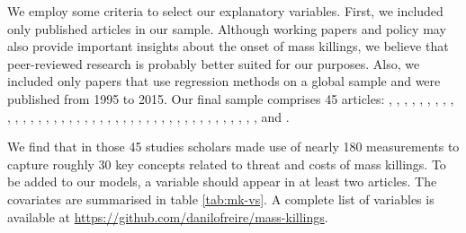 We employ some criteria to select our explanatory variables. First, we included only published articles in our sample. Although working papers and policy may also provide important insights about the onset of mass killings, we believe that peer-reviewed research is probably better suited for our purposes. Also, we included only papers that use regression methods on a global sample and were published from 1995 to 2015. Our final sample comprises 45 articles: \citet{anderton2015new}, \citet{balcells2010rivalry, balcells2011continuation}, \citet{besanccon2005relative}, \citet{bulutgil2015social}, \citet{bundervoet2009livestock}, \citet{clayton2016civilianizing}, \citet{colaresi2008kill}, \citet{downes2006desperate, downes2007restraint},  \citet{easterly2006development}, \citet{eck2007one}, \citet{esteban2015strategic}, \citet{fazal2015particular}, \citet{fjelde2014weakening}, \citet{goldsmith2013forecasting}, \citet{harff2003no}, \citet{joshi2017kills}, \citet{kim2010makes}, \citet{kim2016revolutionary}, \citet{kisangani2007political}, \citet{koren2017means}, \citet{krain1997state}, \citet{manekin2013violence}, \citet{mcdoom2013killed,mcdoom2014predicting}, \citet{melander2009new}, \citet{montalvo2008discrete}, \citet{pilster2016differentiation}, \citet{querido2009state}, \citet{raleigh2012violence}, \citet{rost2013will}, \citet{rummel1995democracy}, \citet{schneider2013accounting}, \citet{siroky2015empire}, \citet{stanton2015regulating}, \citet{sullivan2012blood}, \citet{tir2008domestic}, \citet{ulfelder2008assessing}, \citet{ulfelder2012forecasting}, \citet{uzonyi2015civil, uzonyi2016domestic} \citet{valentino2004draining}, \citet{valentino2006covenants}, \citet{verpoorten2012leave}, \citet{wayman2010explaining}, \citet{wig2016local}, and \citet{yanagizawa2014propaganda}.

We find that in those 45 studies scholars made use of nearly 180 measurements to capture roughly 30 key concepts related to threat and costs of mass killings. To be added to our models, a variable should appear in at least two articles. The covariates are summarised in table \ref{tab:mk-vs}. A complete list of variables is available at \href{https://github.com/danilofreire/mass-killings}{https://github.com/danilofreire/mass-killings}.


